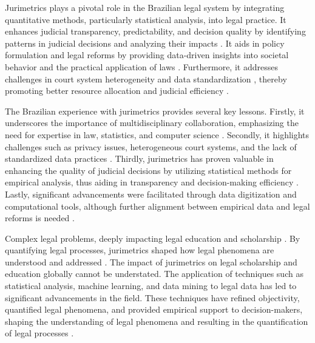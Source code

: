 Jurimetrics plays a pivotal role in the Brazilian legal system by integrating quantitative methods, particularly statistical analysis, into legal practice. It enhances judicial transparency, predictability, and decision quality by identifying patterns in judicial decisions and analyzing their impacts \cite{colombo2017, colombo2017, luvizotto2020}. It aids in policy formulation and legal reforms by providing data-driven insights into societal behavior and the practical application of laws \cite{nunes2018, nunes2018, massuanganhe2016}. Furthermore, it addresses challenges in court system heterogeneity and data standardization \cite{colombo2017}, thereby promoting better resource allocation and judicial efficiency \cite{luvizotto2020, ribeiro2021}.

The Brazilian experience with jurimetrics provides several key lessons. Firstly, it underscores the importance of multidisciplinary collaboration, emphasizing the need for expertise in law, statistics, and computer science \cite{colombo2017, nunes2018}. Secondly, it highlights challenges such as privacy issues, heterogeneous court systems, and the lack of standardized data practices \cite{colombo2017, colombo2017}. Thirdly, jurimetrics has proven valuable in enhancing the quality of judicial decisions by utilizing statistical methods for empirical analysis, thus aiding in transparency and decision-making efficiency \cite{luvizotto2020, nunes2018, nunes2018}. Lastly, significant advancements were facilitated through data digitization and computational tools, although further alignment between empirical data and legal reforms is needed \cite{colombo2017, nunes2018}.

Complex legal problems, deeply impacting legal education and scholarship \cite{1023071190721}. By quantifying legal processes, jurimetrics shaped how legal phenomena are understood and addressed \cite{1023071190721}. The impact of jurimetrics on legal scholarship and education globally cannot be understated. The application of techniques such as statistical analysis, machine learning, and data mining to legal data has led to significant advancements in the field. These techniques have refined objectivity, quantified legal phenomena, and provided empirical support to decision-makers, shaping the understanding of legal phenomena and resulting in the quantification of legal processes \cite{aafedeccbdaceab,cadcdbdbbdad,faecffafcada,aeadeccffe,ccdacdfbcdaf}.

